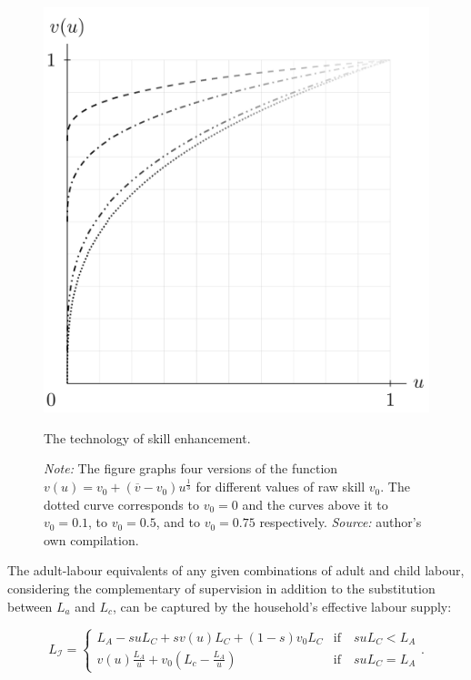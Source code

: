 \documentclass[a4paper,12pt]{article}
\theoremstyle{plain}
\theoremstyle{definition}
\theoremstyle{definition}
\theoremstyle{definition}
\theoremstyle{definition}
\begin{document}
\begin{figure}[h]
\centering
\includegraphics[scale=0.5]{fig_skilltech}
\caption{The technology of skill enhancement.}
\caption*{\footnotesize{\textit{Note:} The figure graphs four versions of the function $v(u)=v_0+(\overline{v}-v_0)u^{\frac{1}{3}}$ for different values of raw skill $v_0$. The dotted curve corresponds to $v_0=0$ and the curves above it to $v_0=0.1$, to $v_0=0.5$, and to $v_0=0.75$ respectively. \textit{Source:} author's own compilation.}}
\label{fig:skill_enhancement}
\end{figure}

The adult-labour equivalents of any given combinations of adult and child labour, considering the complementary of supervision in addition to the substitution between $L_a$ and $L_c$, can be captured by the household's effective labour supply:

\begin{equation}
\label{eq:labsup}
    L_{\mathcal{I}} =
        \begin{cases}
            L_A - s u L_C + s v(u) L_C + (1-s) v_0 L_C & \text{if} \quad s u L_C < L_A \\
            v(u) \frac{L_A}{u} + v_0 \left(L_c - \frac{L_A}{u}\right) \quad & \text {if} \quad s u L_C = L_A
        \end{cases}
        .
\end{equation}
\end{document}
